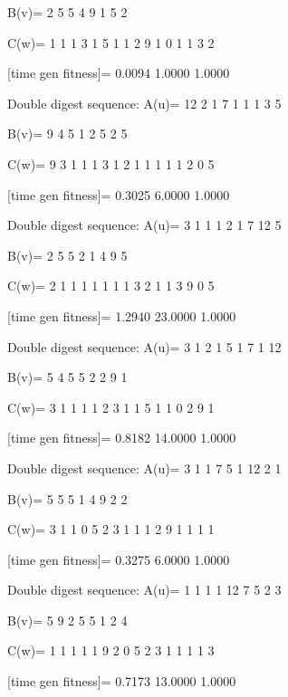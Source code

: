 B(v)=
     2     5     5     4     9     1     5     2

C(w)=
     1     1     1     3     1     5     1     1     2     9     1     0     1     1     3     2

[time gen fitness]=
    0.0094    1.0000    1.0000

Double digest sequence:
A(u)=
    12     2     1     7     1     1     1     3     5

B(v)=
     9     4     5     1     2     5     2     5

C(w)=
     9     3     1     1     1     3     1     2     1     1     1     1     1     2     0     5

[time gen fitness]=
    0.3025    6.0000    1.0000

Double digest sequence:
A(u)=
     3     1     1     1     2     1     7    12     5

B(v)=
     2     5     5     2     1     4     9     5

C(w)=
     2     1     1     1     1     1     1     1     3     2     1     1     3     9     0     5

[time gen fitness]=
    1.2940   23.0000    1.0000

Double digest sequence:
A(u)=
     3     1     2     1     5     1     7     1    12

B(v)=
     5     4     5     5     2     2     9     1

C(w)=
     3     1     1     1     1     2     3     1     1     5     1     1     0     2     9     1

[time gen fitness]=
    0.8182   14.0000    1.0000

Double digest sequence:
A(u)=
     3     1     1     7     5     1    12     2     1

B(v)=
     5     5     5     1     4     9     2     2

C(w)=
     3     1     1     0     5     2     3     1     1     1     2     9     1     1     1     1

[time gen fitness]=
    0.3275    6.0000    1.0000

Double digest sequence:
A(u)=
     1     1     1     1    12     7     5     2     3

B(v)=
     5     9     2     5     5     1     2     4

C(w)=
     1     1     1     1     1     9     2     0     5     2     3     1     1     1     1     3

[time gen fitness]=
    0.7173   13.0000    1.0000

